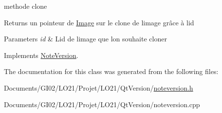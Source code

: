 methode clone 

\begin{DoxyReturn}{Returns}
un pointeur de \hyperlink{class_image}{Image} sur le clone de l\textquotesingle{}image grâce à l\textquotesingle{}id 
\end{DoxyReturn}

\begin{DoxyParams}{Parameters}
{\em id} & L\textquotesingle{}id de l\textquotesingle{}image que l\textquotesingle{}on souhaite cloner \\
\hline
\end{DoxyParams}


Implements \hyperlink{class_note_version_a7eb23a52291ec623b9bc1b6fe3e86c5a}{Note\+Version}.



The documentation for this class was generated from the following files\+:\begin{DoxyCompactItemize}
\item 
Documents/\+G\+I02/\+L\+O21/\+Projet/\+L\+O21/\+Qt\+Version/\hyperlink{noteversion_8h}{noteversion.\+h}\item 
Documents/\+G\+I02/\+L\+O21/\+Projet/\+L\+O21/\+Qt\+Version/noteversion.\+cpp\end{DoxyCompactItemize}
